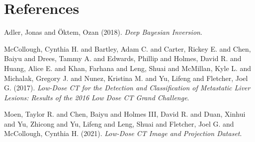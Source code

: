 \documentclass[a4paper, 11pt]{article}
\begin{document}
\section{References}
\label{sec:orgf55e907}
\noindent
Adler, Jonas and Öktem, Ozan (2018). \emph{Deep {{Bayesian Inversion}}}.

\noindent
McCollough, Cynthia H. and Bartley, Adam C. and Carter, Rickey E. and Chen, Baiyu and Drees, Tammy A. and Edwards, Phillip and Holmes, David R. and Huang, Alice E. and Khan, Farhana and Leng, Shuai and McMillan, Kyle L. and Michalak, Gregory J. and Nunez, Kristina M. and Yu, Lifeng and Fletcher, Joel G. (2017). \emph{Low-Dose {{CT}} for the Detection and Classification of Metastatic Liver Lesions: {{Results}} of the 2016 {{Low Dose CT Grand Challenge}}}.

\noindent
Moen, Taylor R. and Chen, Baiyu and Holmes III, David R. and Duan, Xinhui and Yu, Zhicong and Yu, Lifeng and Leng, Shuai and Fletcher, Joel G. and McCollough, Cynthia H. (2021). \emph{Low-Dose {{CT}} Image and Projection Dataset}.
\end{document}
